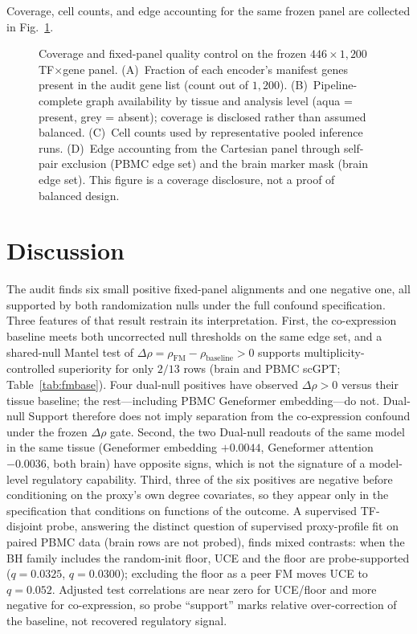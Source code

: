 \documentclass[fleqn,10pt,lineno]{wlpeerj}
\newcommand{\fitfig}[1]{\resizebox{\ifdim\width>\linewidth\linewidth\else\width\fi}{!}{#1}}
\begin{document}
Coverage, cell counts, and edge accounting for the same frozen panel are collected in
Fig.~\ref{fig:coverage}.

\begin{figure}[!tp]\centering
\fitfig{}
\caption{Coverage and fixed-panel quality control on the frozen $446\times 1{,}200$ TF$\times$gene
panel. (A)~Fraction of each encoder's manifest genes present in the audit gene list (count out of
$1{,}200$). (B)~Pipeline-complete graph availability by tissue and analysis level (aqua = present, grey =
absent); coverage is disclosed rather than assumed balanced. (C)~Cell counts used by
representative pooled inference runs. (D)~Edge accounting from the Cartesian panel through
self-pair exclusion (PBMC edge set) and the brain marker mask (brain edge set). This figure is a
coverage disclosure, not a proof of balanced design.}\label{fig:coverage}
\end{figure}
\FloatBarrier
\clearpage

\section{Discussion}
The audit finds six small positive fixed-panel alignments and one negative one, all supported by
both randomization nulls under the full confound specification. Three features of that result
restrain its interpretation. First, the co-expression baseline meets both uncorrected null
thresholds on the same edge set, and a shared-null Mantel test of
$\Delta\rho=\rho_{\mathrm{FM}}-\rho_{\mathrm{baseline}}>0$ supports multiplicity-controlled
superiority for only $2/13$ rows (brain and PBMC scGPT; Table~\ref{tab:fmbase}). Four dual-null
positives have observed $\Delta\rho>0$ versus their tissue baseline; the rest---including PBMC
Geneformer embedding---do not. Dual-null Support therefore does not imply separation from the
co-expression confound under the frozen $\Delta\rho$ gate. Second, the two Dual-null readouts of
the same model in the same tissue (Geneformer embedding $+0.0044$, Geneformer attention
$-0.0036$, both brain) have opposite signs, which is not the signature of a model-level
regulatory capability. Third, three of the six positives are negative before conditioning on the
proxy's own degree covariates, so they appear only in the specification that conditions on
functions of the outcome. A supervised TF-disjoint probe, answering the distinct question of
supervised proxy-profile fit on paired PBMC data (brain rows are not probed), finds mixed contrasts:
when the BH family includes the random-init floor, UCE and the floor are probe-supported ($q=0.0325$,
$q=0.0300$); excluding the floor as a peer FM moves UCE to $q=0.052$. Adjusted test correlations
are near zero for UCE/floor and more negative for co-expression, so probe ``support'' marks relative
over-correction of the baseline, not recovered regulatory signal.
\end{document}
